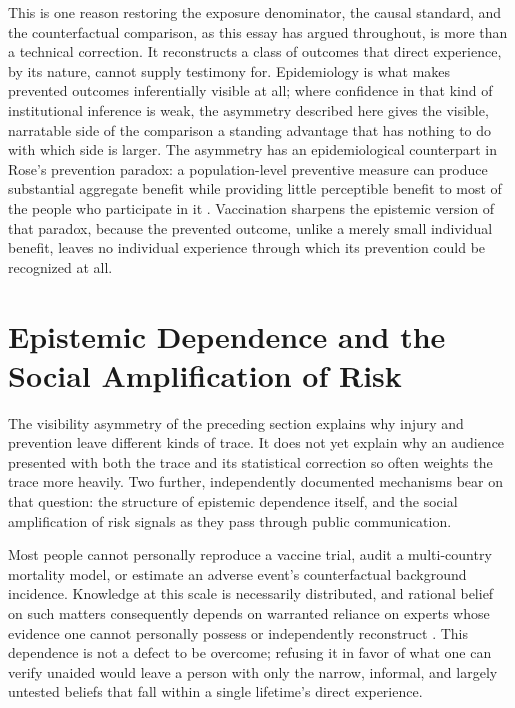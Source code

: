 \documentclass[11pt]{article}
\begin{document}
This is one reason restoring the exposure denominator, the causal standard, and the counterfactual comparison, as this essay has argued throughout, is more than a technical correction. It reconstructs a class of outcomes that direct experience, by its nature, cannot supply testimony for. Epidemiology is what makes prevented outcomes inferentially visible at all; where confidence in that kind of institutional inference is weak, the asymmetry described here gives the visible, narratable side of the comparison a standing advantage that has nothing to do with which side is larger. The asymmetry has an epidemiological counterpart in Rose's prevention paradox: a population-level preventive measure can produce substantial aggregate benefit while providing little perceptible benefit to most of the people who participate in it \citep{rose1981,rose1992}. Vaccination sharpens the epistemic version of that paradox, because the prevented outcome, unlike a merely small individual benefit, leaves no individual experience through which its prevention could be recognized at all.

\section{Epistemic Dependence and the Social Amplification of Risk}

The visibility asymmetry of the preceding section explains why injury and prevention leave different kinds of trace. It does not yet explain why an audience presented with both the trace and its statistical correction so often weights the trace more heavily. Two further, independently documented mechanisms bear on that question: the structure of epistemic dependence itself, and the social amplification of risk signals as they pass through public communication.

Most people cannot personally reproduce a vaccine trial, audit a multi-country mortality model, or estimate an adverse event's counterfactual background incidence. Knowledge at this scale is necessarily distributed, and rational belief on such matters consequently depends on warranted reliance on experts whose evidence one cannot personally possess or independently reconstruct \citep{hardwig1985}. This dependence is not a defect to be overcome; refusing it in favor of what one can verify unaided would leave a person with only the narrow, informal, and largely untested beliefs that fall within a single lifetime's direct experience.
\end{document}
